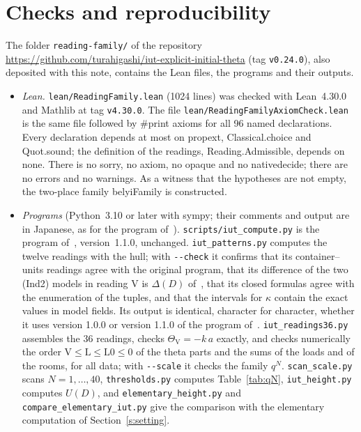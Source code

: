 \documentclass[11pt,a4paper]{article}
\newcommand{\rV}{\mathrm{V}}
\newcommand{\rL}{\mathrm{L}}
\newcommand{\rLz}{\mathrm{L0}}
\newcommand{\leanus}{\textunderscore\allowbreak}
\newcommand{\lean}[1]{{\ttfamily\let\_\leanus #1}}
\theoremstyle{plain}
\theoremstyle{definition}
\theoremstyle{remark}
\begin{document}
\section{Checks and reproducibility}\label{s:checks}
The folder \texttt{reading-family/} of the repository
\url{https://github.com/turahigashi/iut-explicit-initial-theta} (tag \texttt{v0.24.0}), also deposited with this note,
contains the Lean files, the programs and their outputs.
\begin{itemize}
\item \emph{Lean.} \texttt{lean/ReadingFamily.lean} (1024 lines) was checked with Lean~4.30.0 and Mathlib at tag
\texttt{v4.30.0}. The file \texttt{lean/ReadingFamilyAxiomCheck.lean} is the same file followed by \lean{\#print axioms}
for all 96 named declarations. Every declaration depends at most on \lean{propext}, \lean{Classical.choice} and
\lean{Quot.sound}; the definition of the readings, \lean{Reading.Admissible}, depends on none. There is no
\lean{sorry}, no \lean{axiom}, no \lean{opaque} and no \lean{native\_decide}; there are no errors and no warnings. As a
witness that the hypotheses are not empty, the two-place family \lean{belyiFamily} is constructed.
\item \emph{Programs} (Python~3.10 or later with sympy; their comments and output are in Japanese, as for the program
of~\cite{WT}). \texttt{scripts/iut\_compute.py} is the program of~\cite{WT}, version~1.1.0, unchanged.
\texttt{iut\_patterns.py} computes the twelve readings with the hull; with \texttt{-{}-check} it confirms that its
container--units readings agree with the original program, that its difference of the two (Ind2) models in reading V
is $\Delta(D)$ of~\cite{Gap}, that its closed formulas agree with the enumeration of the tuples, and that the intervals
for $\kappa$ contain the exact values in model fields. Its output is identical, character for character, whether it
uses version 1.0.0 or version 1.1.0 of the program of~\cite{WT}. \texttt{iut\_readings36.py} assembles the 36 readings, checks
$\Theta_\rV=-k\,a$ exactly, and checks numerically the order $\rV\le\rL\le\rLz\le0$ of the theta parts and the sums of
the loads and of the rooms, for all data; with \texttt{-{}-scale} it checks the family $q^N$. \texttt{scan\_scale.py}
scans $N=1,\dots,40$, \texttt{thresholds.py} computes Table~\ref{tab:qN}, \texttt{iut\_height.py} computes $U(D)$, and
\texttt{elementary\_height.py} and \texttt{compare\_elementary\_iut.py} give the comparison with the elementary
computation of Section~\ref{s:setting}.
\end{itemize}
\end{document}
